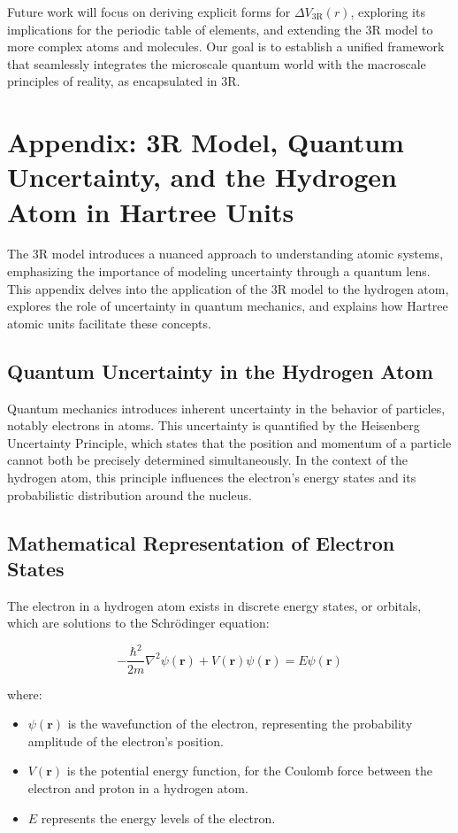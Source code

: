 \documentclass[12pt]{article}
\begin{document}
Future work will focus on deriving explicit forms for $\Delta V_{\text{3R}}(r)$, exploring its implications for the periodic table of elements, and extending the 3R model to more complex atoms and molecules. Our goal is to establish a unified framework that seamlessly integrates the microscale quantum world with the macroscale principles of reality, as encapsulated in 3R.


\section*{Appendix: 3R Model, Quantum Uncertainty, and the Hydrogen Atom in Hartree Units}

The 3R model introduces a nuanced approach to understanding atomic systems, emphasizing the importance of modeling uncertainty through a quantum lens. This appendix delves into the application of the 3R model to the hydrogen atom, explores the role of uncertainty in quantum mechanics, and explains how Hartree atomic units facilitate these concepts.

\subsection*{Quantum Uncertainty in the Hydrogen Atom}

Quantum mechanics introduces inherent uncertainty in the behavior of particles, notably electrons in atoms. This uncertainty is quantified by the Heisenberg Uncertainty Principle, which states that the position and momentum of a particle cannot both be precisely determined simultaneously. In the context of the hydrogen atom, this principle influences the electron's energy states and its probabilistic distribution around the nucleus.

\subsection*{Mathematical Representation of Electron States}

The electron in a hydrogen atom exists in discrete energy states, or orbitals, which are solutions to the Schrödinger equation:

\begin{equation}
    -\frac{\hbar^2}{2m}\nabla^2\psi(\mathbf{r}) + V(\mathbf{r})\psi(\mathbf{r}) = E\psi(\mathbf{r})
\end{equation}

where:
\begin{itemize}
    \item $\psi(\mathbf{r})$ is the wavefunction of the electron, representing the probability amplitude of the electron's position.
    \item $V(\mathbf{r})$ is the potential energy function, for the Coulomb force between the electron and proton in a hydrogen atom.
    \item $E$ represents the energy levels of the electron.
\end{itemize}
\end{document}
